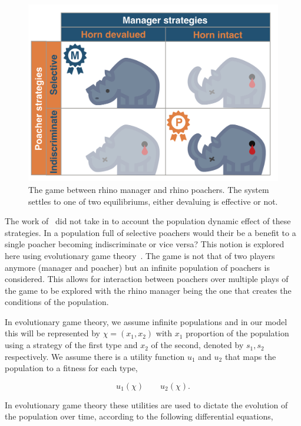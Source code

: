 \documentclass[10pt]{article}
\begin{document}
\begin{figure}[!htbp]
	\centering
	\includegraphics[scale=0.2]{images/RhinoPic.pdf}
	\caption{\label{fig:RhinoPic} The game between rhino manager and rhino 
	poachers. The system settles to one of two equilibriums, either devaluing is effective or not.}
\end{figure}

The work of~\cite{Lee} did not take in to account the population dynamic effect
of  these strategies. In a population full of selective poachers would their be 
a benefit to a single poacher becoming indiscriminate or vice versa? This notion 
is explored here using evolutionary game theory~\cite{Smith}. The 
game is not that of two players anymore (manager and poacher) but an infinite
population of poachers is considered. This allows for interaction between poachers
over multiple plays of the game to be explored with the rhino manager being the
one that creates the conditions of the population. 

In evolutionary game theory, we assume infinite populations and in our
model this will be represented by \(\chi=(x_1, x_2)\) with \(x_1\) proportion of the
population using a strategy of the first type and \(x_2\) of the second, denoted
by \(s_1, s_2\) respectively. We assume there is a utility function \(u_1\) and 
\(u_2\) that maps the population to a fitness for each type,

\[ u_1(\chi)  \qquad u_2(\chi).\] 

In evolutionary game theory these utilities are used to dictate the evolution of
the population over time, according to the following differential equations,
\end{document}

